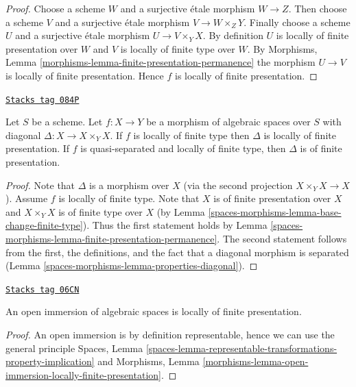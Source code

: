 \begin{proof}
Choose a scheme $W$ and a surjective \'etale morphism $W \to Z$.
Then choose a scheme $V$ and a surjective \'etale morphism $V \to W \times_Z Y$.
Finally choose a scheme $U$ and a surjective \'etale morphism
$U \to V \times_Y X$. By definition $U$ is locally of finite presentation
over $W$ and $V$ is locally of finite type over $W$. By
Morphisms, Lemma \ref{morphisms-lemma-finite-presentation-permanence}
the morphism $U \to V$ is locally of finite presentation.
Hence $f$ is locally of finite presentation.
\end{proof}

\begin{lemma}
\label{spaces-morphisms-lemma-diagonal-morphism-finite-type}
\href{https://stacks.math.columbia.edu/tag/084P}{\texttt{Stacks tag 084P}}

Let $S$ be a scheme. Let $f : X \to Y$ be a morphism of algebraic spaces
over $S$ with diagonal $\Delta : X \to X \times_Y X$. If $f$ is locally of
finite type then $\Delta$ is locally of finite presentation. If $f$ is
quasi-separated and locally of finite type, then $\Delta$ is of finite
presentation.
\end{lemma}

\begin{proof}
Note that $\Delta$ is a morphism over $X$ (via the second
projection $X \times_Y X \to X$). Assume $f$ is locally of finite type.
Note that $X$ is of finite presentation over $X$ and $X \times_Y X$ is
of finite type over $X$ (by Lemma \ref{spaces-morphisms-lemma-base-change-finite-type}).
Thus the first statement holds by
Lemma \ref{spaces-morphisms-lemma-finite-presentation-permanence}.
The second statement follows from the first, the definitions, and
the fact that a diagonal morphism is separated
(Lemma \ref{spaces-morphisms-lemma-properties-diagonal}).
\end{proof}

\begin{lemma}
\label{spaces-morphisms-lemma-open-immersion-locally-finite-presentation}
\href{https://stacks.math.columbia.edu/tag/06CN}{\texttt{Stacks tag 06CN}}

An open immersion of algebraic spaces is locally of finite presentation.
\end{lemma}

\begin{proof}
An open immersion is by definition representable, hence we can
use the general principle
Spaces,
Lemma \ref{spaces-lemma-representable-transformations-property-implication}
and
Morphisms,
Lemma \ref{morphisms-lemma-open-immersion-locally-finite-presentation}.
\end{proof}

